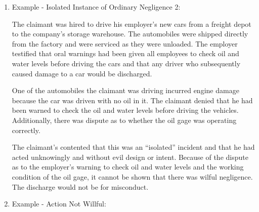 \documentclass[12pt]{article}
\newcommand{\1}{\mathbf{1}}
\begin{document}
\begin{appendix}
\begin{enumerate}
In \emph{Silva v. CUIAB} (First Appellate Court, 1973), the claimant was being trained for new and unfamiliar work; he became nervous and frustrated and either ``blew up'' or felt he was going to blow up. He left work without permission in midafternoon. The employer was aware of some emotional problems the claimant was having. The employer spoke to the claimant the next morning about his unauthorized departure. The claimant's reply was sarcastic and, when told if such action was repeated he would be discharged, he responded with a vulgar remark. He was told if that was the way he felt, he could leave, whereupon he left. He would have been discharged for his attitude and language that morning had he not left. The court held:
\begin{quotation}
Given the tests of fault and wilful or wanton behavior as essential elements of 'misconduct', the single instance of an offensive remark ... uttered in the circumstances disclosed falls within the category of a mere mistake or error in judgment, a 'minor pecadillo' and is not misconduct disqualifying appellant from unemployment insurance benefits.
\end{quotation}

\item Example - Isolated Instance of Ordinary Negligence 2:

The claimant was hired to drive his employer's new cars from a freight depot to the company's storage warehouse. The automobiles were shipped directly from the factory and were serviced as they were unloaded. The employer testified that oral warnings had been given all employees to check oil and water levels before driving the cars and that any driver who subsequently caused damage to a car would be discharged.

One of the automobiles the claimant was driving incurred engine damage because the car was driven with no oil in it. The claimant denied that he had been warned to check the oil and water levels before driving the vehicles. Additionally, there was dispute as to whether the oil gage was operating correctly.

The claimant's contented that this was an ``isolated'' incident and that he had acted unknowingly and without evil design or intent. Because of the dispute as to the employer's warning to check oil and water levels and the working condition of the oil gage, it cannot be shown that there was wilful negligence. The discharge would not be for misconduct.


\item Example - Action Not Willful:


\end{enumerate}
\end{appendix}
\end{document}
